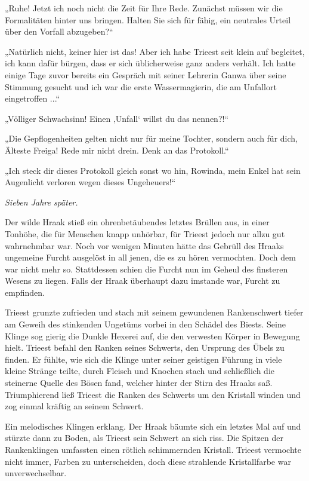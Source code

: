 „Ruhe! Jetzt ich noch nicht die Zeit für Ihre Rede. Zunächst müssen wir die Formalitäten hinter uns bringen. Halten Sie sich für fähig, ein neutrales Urteil über den Vorfall abzugeben?“

„Natürlich nicht, keiner hier ist das! Aber ich habe Trieest seit klein auf begleitet, ich kann dafür bürgen, dass er sich üblicherweise ganz anders verhält. Ich hatte einige Tage zuvor bereits ein Gespräch mit seiner Lehrerin Ganwa über seine Stimmung gesucht und ich war die erste Wassermagierin, die am Unfallort eingetroffen ...“

„Völliger Schwachsinn! Einen ‚Unfall‘ willst du das nennen?!“

„Die Gepflogenheiten gelten nicht nur für meine Tochter, sondern auch für dich, Älteste Freiga! Rede mir nicht drein. Denk an das Protokoll.“

„Ich steck dir dieses Protokoll gleich sonst wo hin, Rowinda, mein Enkel hat sein Augenlicht verloren wegen dieses Ungeheuers!“\bigskip








\textit{Sieben Jahre später.}\bigskip



Der wilde Hraak stieß ein ohrenbetäubendes letztes Brüllen aus, in einer Tonhöhe, die für Menschen knapp unhörbar, für Trieest jedoch nur allzu gut wahrnehmbar war. Noch vor wenigen Minuten hätte das Gebrüll des Hraaks ungemeine Furcht ausgelöst in all jenen, die es zu hören vermochten. Doch dem war nicht mehr so. Stattdessen schien die Furcht nun im Geheul des finsteren Wesens zu liegen. Falls der Hraak überhaupt dazu imstande war, Furcht zu empfinden.

Trieest grunzte zufrieden und stach mit seinem gewundenen Rankenschwert tiefer am Geweih des stinkenden Ungetüms vorbei in den Schädel des Biests. Seine Klinge sog gierig die Dunkle Hexerei auf, die den verwesten Körper in Bewegung hielt. Trieest befahl den Ranken seines Schwerts, den Ursprung des Übels zu finden. Er fühlte, wie sich die Klinge unter seiner geistigen Führung in viele kleine Stränge teilte, durch Fleisch und Knochen stach und schließlich die steinerne Quelle des Bösen fand, welcher hinter der Stirn des Hraaks saß. Triumphierend ließ Trieest die Ranken des Schwerts um den Kristall winden und zog einmal kräftig an seinem Schwert.

Ein melodisches Klingen erklang. Der Hraak bäumte sich ein letztes Mal auf und stürzte dann zu Boden, als Trieest sein Schwert an sich riss. Die Spitzen der Rankenklingen umfassten einen rötlich schimmernden Kristall. Trieest vermochte nicht immer, Farben zu unterscheiden, doch diese strahlende Kristallfarbe war unverwechselbar.

